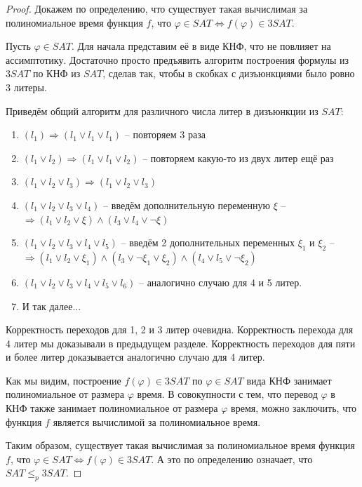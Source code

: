 \documentclass[a4paper,12pt]{article}
\begin{document}
\begin{proof}
    Докажем по определению, что существует такая вычислимая за полиномиальное время функция $f$, что $\varphi \in SAT \Longleftrightarrow f(\varphi) \in 3SAT$.
    
    Пусть $\varphi \in SAT$. Для начала представим её в виде КНФ, что не повлияет на ассимптотику. Достаточно просто предъявить алгоритм построения формулы из $3SAT$ по КНФ из $SAT$, сделав так, чтобы в скобках с дизъюнкциями было ровно 3 литеры.
    
    Приведём общий алгоритм для различного числа литер в дизъюнкции из $SAT$:
    \begin{enumerate}
        \item $(l_1) \Longrightarrow (l_1 \vee l_1 \vee l_1)$ -- повторяем 3 раза
        \item $(l_1 \vee l_2) \Longrightarrow (l_1 \vee l_1 \vee l_2)$ -- повторяем какую-то из двух литер ещё раз
        \item $(l_1 \vee l_2 \vee l_3) \Longrightarrow (l_1 \vee l_2 \vee l_3)$
        \item $(l_1 \vee l_2 \vee l_3 \vee l_4)$ -- введём дополнительную переменную $\xi$ --\\ $\Longrightarrow (l_1 \vee l_2 \vee \xi) \wedge (l_3 \vee l_4 \vee \neg \xi)$
        \item $(l_1 \vee l_2 \vee l_3 \vee l_4 \vee l_5)$ -- введём 2 дополнительных переменных $\xi_1$ и $\xi_2$ -- \\ $\Longrightarrow (l_1 \vee l_2 \vee \xi_1) \wedge (l_3 \vee \neg\xi_1 \vee \xi_2) \wedge (l_4 \vee l_5 \vee \neg\xi_2)$
        \item $(l_1 \vee l_2 \vee l_3 \vee l_4 \vee l_5 \vee l_6)$ -- аналогично случаю для 4 и 5 литер.
        \item И так далее...
    \end{enumerate}
    Корректность переходов для 1, 2 и 3 литер очевидна. Корректность перехода для 4 литер мы доказывали в предыдущем разделе. Корректность переходов для пяти и более литер доказывается аналогично случаю для 4 литер.
    
    Как мы видим, построение $f(\varphi) \in 3SAT$ по $\varphi \in SAT$ вида КНФ занимает полиномиальное от размера $\varphi$ время. В совокупности с тем, что перевод $\varphi$ в КНФ также занимает полиномиальное от размера $\varphi$ время, можно заключить, что функция $f$ является вычислимой за полиномиальное время.
    
    Таким образом, существует такая вычислимая за полиномиальное время функция $f$, что $\varphi \in SAT \Longleftrightarrow f(\varphi) \in 3SAT$. А это по определению означает, что $SAT \leqslant_p 3SAT$.
\end{proof}
\end{document}
